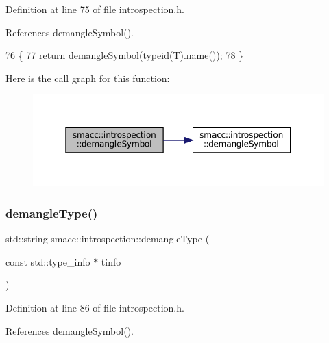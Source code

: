 Definition at line 75 of file introspection.\+h.



References demangle\+Symbol().


\begin{DoxyCode}
76 \{
77     \textcolor{keywordflow}{return} \hyperlink{namespacesmacc_1_1introspection_aa9158a0ff0cfe83a59877e6af7d7f873}{demangleSymbol}(\textcolor{keyword}{typeid}(T).name());
78 \}
\end{DoxyCode}
Here is the call graph for this function\+:
\nopagebreak
\begin{figure}[H]
\begin{center}
\leavevmode
\includegraphics[width=350pt]{namespacesmacc_1_1introspection_aa9158a0ff0cfe83a59877e6af7d7f873_cgraph}
\end{center}
\end{figure}
\mbox{\label{namespacesmacc_1_1introspection_a670e39ccea29952859df4e2d0e45077b}} 
\subsubsection{\texorpdfstring{demangle\+Type()}{demangleType()}\hspace{0.1cm}{\footnotesize\ttfamily [1/2]}}
{\footnotesize\ttfamily std\+::string smacc\+::introspection\+::demangle\+Type (\begin{DoxyParamCaption}\item[{const std\+::type\+\_\+info $\ast$}]{tinfo }\end{DoxyParamCaption})\hspace{0.3cm}{\ttfamily [inline]}}



Definition at line 86 of file introspection.\+h.



References demangle\+Symbol().



